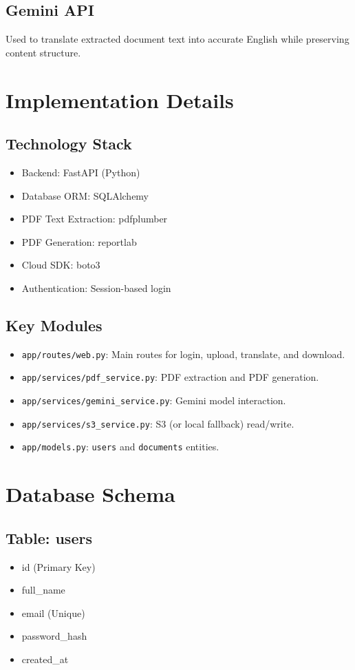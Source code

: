 \documentclass[12pt]{article}
\begin{document}
\subsection*{Gemini API}
Used to translate extracted document text into accurate English while preserving content structure.

\section{Implementation Details}
\subsection*{Technology Stack}
\begin{itemize}[leftmargin=*]
    \item Backend: FastAPI (Python)
    \item Database ORM: SQLAlchemy
    \item PDF Text Extraction: pdfplumber
    \item PDF Generation: reportlab
    \item Cloud SDK: boto3
    \item Authentication: Session-based login
\end{itemize}

\subsection*{Key Modules}
\begin{itemize}[leftmargin=*]
    \item \texttt{app/routes/web.py}: Main routes for login, upload, translate, and download.
    \item \texttt{app/services/pdf\_service.py}: PDF extraction and PDF generation.
    \item \texttt{app/services/gemini\_service.py}: Gemini model interaction.
    \item \texttt{app/services/s3\_service.py}: S3 (or local fallback) read/write.
    \item \texttt{app/models.py}: \texttt{users} and \texttt{documents} entities.
\end{itemize}

\section{Database Schema}
\subsection*{Table: users}
\begin{itemize}[leftmargin=*]
    \item id (Primary Key)
    \item full\_name
    \item email (Unique)
    \item password\_hash
    \item created\_at
\end{itemize}
\end{document}
